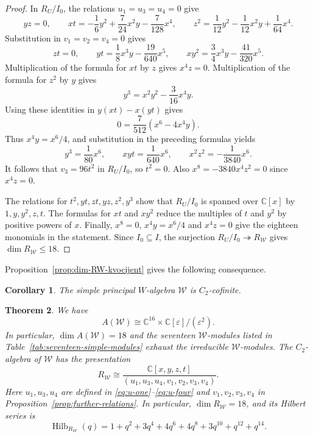 \documentclass[11pt]{amsart}
\numberwithin{equation}{section}
\newtheorem{theorem}{Theorem}[section]
\newtheorem{corollary}[theorem]{Corollary}
\theoremstyle{definition}
\theoremstyle{remark}
\newcommand{\CC}{\mathbb C}
\begin{document}
\begin{proof}
In $R_U/I_0$, the relations $u_1=u_3=u_4=0$ give
\[
 yz=0,\qquad
 xt=-\frac16y^2+\frac7{24}x^2y-\frac7{128}x^4,\qquad
 z^2=\frac1{12}y^2-\frac1{12}x^2y+\frac1{64}x^4.
\]
Substitution in $v_1=v_2=v_4=0$ gives
\[
 zt=0,\qquad
 yt=\frac18x^3y-\frac{19}{640}x^5,\qquad
 xy^2=\frac34x^3y-\frac{41}{320}x^5.
\]
Multiplication of the formula for $xt$ by $z$ gives $x^4z=0$.
Multiplication of the formula for $z^2$ by $y$ gives
\[
 y^3=x^2y^2-\frac3{16}x^4y.
\]
Using these identities in $y(xt)-x(yt)$ gives
\[
 0=\frac7{512}(x^6-4x^4y).
\]
Thus $x^4y=x^6/4$, and substitution in the preceding formulas yields
\[
 y^3=\frac1{80}x^6,\qquad
 xyt=\frac1{640}x^6,\qquad
 x^2z^2=-\frac1{3840}x^6.
\]
It follows that $v_3=96t^2$ in $R_U/I_0$, so $t^2=0$.
Also $x^8=-3840x^4z^2=0$ since $x^4z=0$.

The relations for $t^2,yt,zt,yz,z^2,y^3$ show that $R_U/I_0$ is
spanned over $\CC[x]$ by $1,y,y^2,z,t$. The formulas for $xt$ and
$xy^2$ reduce the multiples of $t$ and $y^2$ by positive powers
of $x$. Finally, $x^8=0$, $x^4y=x^6/4$ and $x^4z=0$ give the
eighteen monomials in the statement. Since $I_0\subseteq I$, the
surjection $R_U/I_0\twoheadrightarrow R_{\mathcal W}$ gives
$\dim R_{\mathcal W}\leq18$.
\end{proof}



Proposition~\ref{prop:dim-RW-kvocijent} gives the following consequence.

\begin{corollary}
	The simple principal $W$-algebra
	$\mathcal W$ is $C_2$-cofinite.
\end{corollary}


\begin{theorem}\label{thm:Zhu-C2-iso}
	We have
	\[
	A(\mathcal W)\cong
	\mathbb C^{16}\times
	\mathbb C[\varepsilon]/(\varepsilon^2).
	\]
	In particular, $\dim A(\mathcal W)=18$ and the seventeen $\mathcal W$-modules
	listed in Table~\ref{tab:seventeen-simple-modules} exhaust the irreducible
$\mathcal W$-modules. The $C_2$-algebra of $\mathcal W$ has the presentation
	\[
	R_{\mathcal W}\cong
	\frac{\mathbb C[x,y,z,t]}
	{(u_1,u_3,u_4,v_1,v_2,v_3,v_4)}.
	\]
Here $u_1,u_3,u_4$ are defined in \eqref{eq:u-one}--\eqref{eq:u-four}
and $v_1,v_2,v_3,v_4$ in Proposition~\ref{prop:further-relations}.
In particular, $\dim R_{\mathcal W}=18$, and its
		Hilbert series is
		\[
		\operatorname{Hilb}_{R_{\mathcal W}}(q)
		=
		1+q^2+3q^4+4q^6+4q^8
		+3q^{10}+q^{12}+q^{14}.
		\]
	\end{theorem}
	
\end{document}
